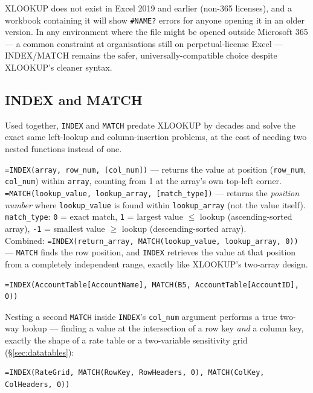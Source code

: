 \documentclass[11pt,a4paper]{article}
\begin{document}
\begin{pitfall}
XLOOKUP does not exist in Excel 2019 and earlier (non-365 licenses), and a workbook containing it will show \texttt{\#NAME?} errors for anyone opening it in an older version. In any environment where the file might be opened outside Microsoft 365 --- a common constraint at organisations still on perpetual-license Excel --- INDEX/MATCH remains the safer, universally-compatible choice despite XLOOKUP's cleaner syntax.
\end{pitfall}

\subsection{INDEX and MATCH}
\label{sec:indexmatch}

Used together, \texttt{INDEX} and \texttt{MATCH} predate XLOOKUP by decades and solve the exact same left-lookup and column-insertion problems, at the cost of needing two nested functions instead of one.

\begin{formulasyntax}
\texttt{=INDEX(array, row\_num, [col\_num])} --- returns the value at position (\texttt{row\_num}, \texttt{col\_num}) within \texttt{array}, counting from 1 at the array's own top-left corner.\\[4pt]
\texttt{=MATCH(lookup\_value, lookup\_array, [match\_type])} --- returns the \emph{position number} where \texttt{lookup\_value} is found within \texttt{lookup\_array} (not the value itself). \texttt{match\_type}: \texttt{0} = exact match, \texttt{1} = largest value $\leq$ lookup (ascending-sorted array), \texttt{-1} = smallest value $\geq$ lookup (descending-sorted array).\\[4pt]
Combined: \texttt{=INDEX(return\_array, MATCH(lookup\_value, lookup\_array, 0))} --- \texttt{MATCH} finds the row position, and \texttt{INDEX} retrieves the value at that position from a completely independent range, exactly like XLOOKUP's two-array design.
\end{formulasyntax}

\begin{lstlisting}[style=excelstyle, caption={INDEX/MATCH performing the same left-lookup XLOOKUP did above}]
=INDEX(AccountTable[AccountName], MATCH(B5, AccountTable[AccountID], 0))
\end{lstlisting}

\begin{protip}
Nesting a second \texttt{MATCH} inside \texttt{INDEX}'s \texttt{col\_num} argument performs a true two-way lookup --- finding a value at the intersection of a row key \emph{and} a column key, exactly the shape of a rate table or a two-variable sensitivity grid (\S\ref{sec:datatables}):
\begin{lstlisting}[style=excelstyle]
=INDEX(RateGrid, MATCH(RowKey, RowHeaders, 0), MATCH(ColKey, ColHeaders, 0))
\end{lstlisting}
\end{protip}
\end{document}
